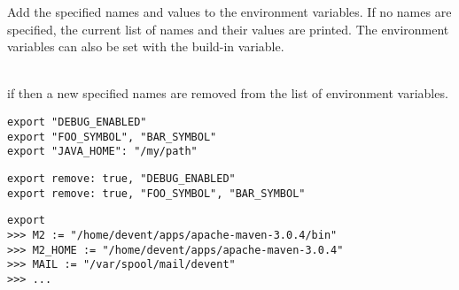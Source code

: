 %


Add the specified names and values to the environment variables.
If no names are specified, the current list of names and their values are
printed. The environment variables can also be set with the 
build-in variable.

\begin{asparadesc}
%
\item[\code{remove: true|false}]  \hfill \\
if  then a new specified names are removed from the list of
environment variables.
%
\end{asparadesc}

\begin{lstlisting}[style=Groovybash, label={lst:example_export_set}, title={
Add or change environment variables.}]
export "DEBUG_ENABLED"
export "FOO_SYMBOL", "BAR_SYMBOL"
export "JAVA_HOME": "/my/path"
\end{lstlisting}

\begin{lstlisting}[style=Groovybash, label={lst:example_export_remove}, title={
Remove environment variables.}]
export remove: true, "DEBUG_ENABLED"
export remove: true, "FOO_SYMBOL", "BAR_SYMBOL"
\end{lstlisting}

\begin{lstlisting}[style=Groovybash, label={lst:example_export_print}, title={
Print environment variables.}]
export
>>> M2 := "/home/devent/apps/apache-maven-3.0.4/bin"
>>> M2_HOME := "/home/devent/apps/apache-maven-3.0.4"
>>> MAIL := "/var/spool/mail/devent"
>>> ...
\end{lstlisting}
